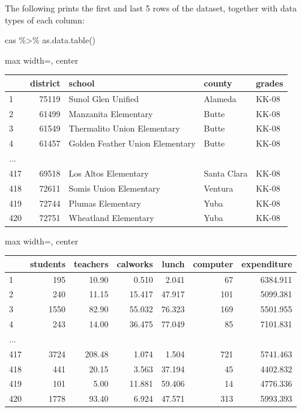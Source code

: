 \documentclass[
  12pt,
  a4paper,
]{scrbook}
\newenvironment{Shaded}{\begin{snugshade}}{\end{snugshade}}
\newcommand{\FunctionTok}[1]{\textcolor[rgb]{0.28,0.35,0.67}{#1}}
\newcommand{\NormalTok}[1]{\textcolor[rgb]{0.00,0.23,0.31}{#1}}
\newcommand{\SpecialCharTok}[1]{\textcolor[rgb]{0.37,0.37,0.37}{#1}}
\theoremstyle{plain}
\theoremstyle{definition}
\theoremstyle{remark}
\begin{document}
The following prints the first and last 5 rows of the dataset, together
with data types of each column:

\begin{Shaded}
\begin{Highlighting}[]
\NormalTok{cas }\SpecialCharTok{\%\textgreater{}\%} \FunctionTok{as.data.table}\NormalTok{()}
\end{Highlighting}
\end{Shaded}

\begingroup\small
\begin{adjustbox}{max width=\linewidth, center}
\begin{tabular}{lrlll}
\toprule
  & district & school & county & grades\\
\midrule
1 & 75119 & Sunol Glen Unified & Alameda & KK-08\\
2 & 61499 & Manzanita Elementary & Butte & KK-08\\
3 & 61549 & Thermalito Union Elementary & Butte & KK-08\\
4 & 61457 & Golden Feather Union Elementary & Butte & KK-08\\
... &  &  &  & \\
417 & 69518 & Los Altos Elementary & Santa Clara & KK-08\\
418 & 72611 & Somis Union Elementary & Ventura & KK-08\\
419 & 72744 & Plumas Elementary & Yuba & KK-08\\
420 & 72751 & Wheatland Elementary & Yuba & KK-08\\
\bottomrule
\end{tabular}
\end{adjustbox}
\par\medskip
\begin{adjustbox}{max width=\linewidth, center}
\begin{tabular}{lrrrrrr}
\toprule
  & students & teachers & calworks & lunch & computer & expenditure\\
\midrule
1 & 195 & 10.90 & 0.510 & 2.041 & 67 & 6384.911\\
2 & 240 & 11.15 & 15.417 & 47.917 & 101 & 5099.381\\
3 & 1550 & 82.90 & 55.032 & 76.323 & 169 & 5501.955\\
4 & 243 & 14.00 & 36.475 & 77.049 & 85 & 7101.831\\
... &  &  &  &  &  & \\
417 & 3724 & 208.48 & 1.074 & 1.504 & 721 & 5741.463\\
418 & 441 & 20.15 & 3.563 & 37.194 & 45 & 4402.832\\
419 & 101 & 5.00 & 11.881 & 59.406 & 14 & 4776.336\\
420 & 1778 & 93.40 & 6.924 & 47.571 & 313 & 5993.393\\
\bottomrule
\end{tabular}
\end{adjustbox}
\end{document}

